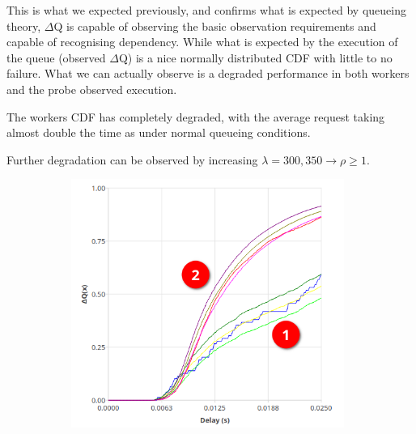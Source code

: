    This is what we expected previously, and confirms what is expected by queueing theory, $\Delta$Q is capable of observing the basic observation requirements and capable of recognising dependency. While what is expected by the execution of the queue (observed $\Delta$Q) is a nice normally distributed CDF with little to no failure. What we can actually observe is a degraded performance in both workers and the probe observed execution.

    The workers CDF has completely degraded, with the average request taking almost double the time as under normal queueing conditions. 

    Further degradation can be observed by increasing $\lambda = {300, 350} \rightarrow \rho \ge 1$.

    \begin{figure}[H]
            \centering
            \begin{subfigure}{.5\textwidth}
                \centering
                \includegraphics[width=0.98\textwidth]{img/overload_2/300_probe2.png}
                \label{fig:high_load_1}
            \end{subfigure}%
            \begin{subfigure}{.5\textwidth}
                \centering

\end{subfigure}
\end{figure}
